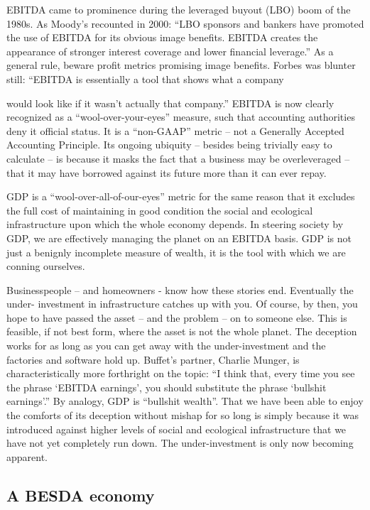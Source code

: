 \documentclass[
]{book}
\begin{document}
EBITDA came to prominence during the leveraged buyout (LBO) boom of the 1980s. As
Moody's recounted in 2000: ``LBO sponsors and bankers have promoted the use of EBITDA
for its obvious image benefits. EBITDA creates the appearance of stronger interest coverage
and lower financial leverage.'' As a general rule, beware profit metrics promising image
benefits. Forbes was blunter still: ``EBITDA is essentially a tool that shows what a company

would look like if it wasn't actually that company.''
EBITDA is now clearly recognized as a ``wool-over-your-eyes'' measure, such that accounting
authorities deny it official status. It is a ``non-GAAP'' metric -- not a Generally Accepted
Accounting Principle. Its ongoing ubiquity -- besides being trivially easy to calculate -- is
because it masks the fact that a business may be overleveraged -- that it may have borrowed
against its future more than it can ever repay.

GDP is a ``wool-over-all-of-our-eyes'' metric for the same reason that it excludes the full cost
of maintaining in good condition the social and ecological infrastructure upon which the whole
economy depends. In steering society by GDP, we are effectively managing the planet on an
EBITDA basis. GDP is not just a benignly incomplete measure of wealth, it is the tool with
which we are conning ourselves.

Businesspeople -- and homeowners - know how these stories end. Eventually the under-
investment in infrastructure catches up with you. Of course, by then, you hope to have passed
the asset -- and the problem -- on to someone else. This is feasible, if not best form, where the
asset is not the whole planet. The deception works for as long as you can get away with the
under-investment and the factories and software hold up.
Buffet's partner, Charlie Munger, is characteristically more forthright on the topic:
``I think that, every time you see the phrase `EBITDA earnings', you should
substitute the phrase `bullshit earnings'.''
By analogy, GDP is ``bullshit wealth''. That we have been able to enjoy the comforts of its
deception without mishap for so long is simply because it was introduced against higher
levels of social and ecological infrastructure that we have not yet completely run down. The
under-investment is only now becoming apparent.

\hypertarget{a-besda-economy}{%
\subsection{A BESDA economy}\label{a-besda-economy}}
\end{document}
